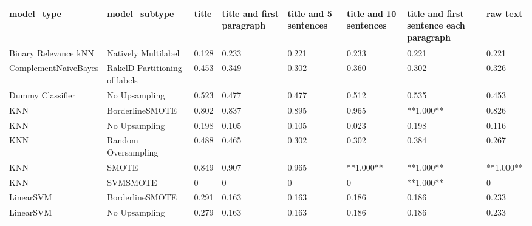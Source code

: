 \begin{tabular}{llllllll}
\toprule
                     model\_type &                 model\_subtype & title & title and first paragraph & title and 5 sentences & title and 10 sentences & title and first sentence each paragraph &  raw text \\
\midrule
           Binary Relevance kNN &           Natively Multilabel & 0.128 &                     0.233 &                 0.221 &                  0.233 &                                   0.221 &     0.221 \\
           ComplementNaiveBayes & RakelD Partitioning of labels & 0.453 &                     0.349 &                 0.302 &                  0.360 &                                   0.302 &     0.326 \\
               Dummy Classifier &                 No Upsampling & 0.523 &                     0.477 &                 0.477 &                  0.512 &                                   0.535 &     0.453 \\
                            KNN &               BorderlineSMOTE & 0.802 &                     0.837 &                 0.895 &                  0.965 &                               **1.000** &     0.826 \\
                            KNN &                 No Upsampling & 0.198 &                     0.105 &                 0.105 &                  0.023 &                                   0.198 &     0.116 \\
                            KNN &           Random Oversampling & 0.488 &                     0.465 &                 0.302 &                  0.302 &                                   0.384 &     0.267 \\
                            KNN &                         SMOTE & 0.849 &                     0.907 &                 0.965 &              **1.000** &                               **1.000** & **1.000** \\
                            KNN &                      SVMSMOTE &     0 &                         0 &                     0 &                      0 &                               **1.000** &         0 \\
                      LinearSVM &               BorderlineSMOTE & 0.291 &                     0.163 &                 0.163 &                  0.186 &                                   0.186 &     0.233 \\
                      LinearSVM &                 No Upsampling & 0.279 &                     0.163 &                 0.163 &                  0.186 &                                   0.186 &     0.233 \\

\end{tabular}
